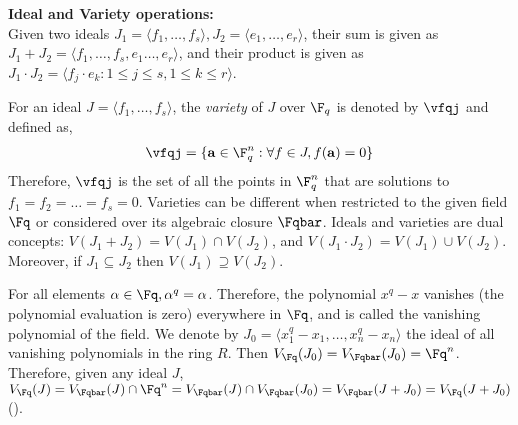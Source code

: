 {\bf Ideal and Variety operations:}\\ 
Given two ideals $J_1 = \langle f_1,\dots,f_s\rangle, J_2=\langle
e_1,\dots,e_r\rangle$, their sum is given as $J_1 + J_2 = \langle
f_1,\dots,f_s,e_1\dots,e_r\rangle$, and their product is given as $J_1\cdot J_2 =
\langle f_j\cdot e_k: 1\leq j\leq s, 1\leq k\leq r\rangle$. 
\par For an ideal $J = \langle f_1, \dots, f_s \rangle$, the {\it variety} of
$J$ over $\F_q$ is denoted by $\vfqj$ and defined as, 
\begin{align*}
\vfqj = \{\mathbf{a} \in \F_q^n: \forall f \in J,f(\mathbf{a})=0\}
\end{align*}
Therefore, $\vfqj$ is the set of all the points in $\F_q^n$ that are
solutions to $f_1 = f_2 = \dots = f_s = 0$. Varieties can 
be different when restricted to the given field $\Fq$
or considered over its algebraic closure $\Fqbar$.
Ideals and varieties are dual concepts: $V(J_1 + J_2) = V(J_1) \cap V(J_2)$, and
$V(J_1\cdot J_2) = V(J_1) \cup V(J_2)$. Moreover, if $J_1 \subseteq
J_2$ then $V(J_1)\supseteq V(J_2)$.


\par For all elements $\alpha \in \Fq, \alpha^q = \alpha$. Therefore, the
polynomial $x^q-x$ vanishes (the polynomial evaluation is zero)
everywhere in $\Fq$, and is called the
vanishing polynomial of the field. We denote by $J_0 = \langle
x_1^q-x_1,\dots,x_n^q-x_n\rangle$ the ideal of all vanishing
polynomials in the ring $R$. Then $V_{\Fq}(J_0) = V_{\Fqbar}(J_0) =
\Fq^n$. Therefore, given any ideal $J$, $V_{\Fq}(J) = V_{\Fqbar}(J)
\cap\Fq^n = V_{\Fqbar}(J) \cap V_{\Fqbar}(J_0) = V_{\Fqbar}(J+J_0) =
V_{\Fq}(J+J_0)$ (\cite{gao:gf-gb-ms}).

